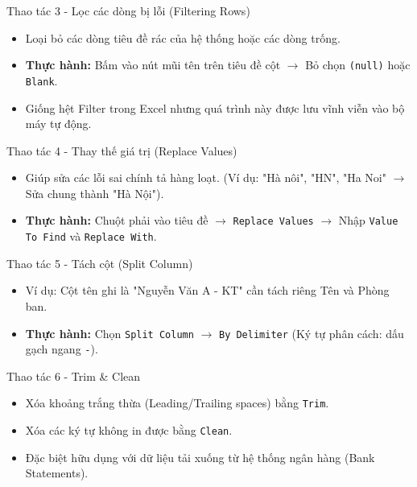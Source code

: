 \documentclass[aspectratio=169]{beamer}
\begin{document}
\begin{frame}{Thao tác 3 - Lọc các dòng bị lỗi (Filtering Rows)}
    \begin{itemize}
        \item Loại bỏ các dòng tiêu đề rác của hệ thống hoặc các dòng trống.
        \item \textbf{Thực hành:} Bấm vào nút mũi tên trên tiêu đề cột $\rightarrow$ Bỏ chọn \texttt{(null)} hoặc \texttt{Blank}.
        \item Giống hệt Filter trong Excel nhưng quá trình này được lưu vĩnh viễn vào bộ máy tự động.
    \end{itemize}
\end{frame}


\begin{frame}{Thao tác 4 - Thay thế giá trị (Replace Values)}
    \begin{itemize}
        \item Giúp sửa các lỗi sai chính tả hàng loạt. (Ví dụ: "Hà nôi", "HN", "Ha Noi" $\rightarrow$ Sửa chung thành "Hà Nội").
        \item \textbf{Thực hành:} Chuột phải vào tiêu đề $\rightarrow$ \texttt{Replace Values} $\rightarrow$ Nhập \texttt{Value To Find} và \texttt{Replace With}.
    \end{itemize}
\end{frame}


\begin{frame}{Thao tác 5 - Tách cột (Split Column)}
    \begin{itemize}
        \item Ví dụ: Cột tên ghi là "Nguyễn Văn A - KT" cần tách riêng Tên và Phòng ban.
        \item \textbf{Thực hành:} Chọn \texttt{Split Column} $\rightarrow$ \texttt{By Delimiter} (Ký tự phân cách: dấu gạch ngang \texttt{-}).
    \end{itemize}
\end{frame}


\begin{frame}{Thao tác 6 - Trim \& Clean}
    \begin{itemize}
        \item Xóa khoảng trắng thừa (Leading/Trailing spaces) bằng \texttt{Trim}.
        \item Xóa các ký tự không in được bằng \texttt{Clean}.
        \item Đặc biệt hữu dụng với dữ liệu tải xuống từ hệ thống ngân hàng (Bank Statements).
    \end{itemize}
\end{frame}
\end{document}
